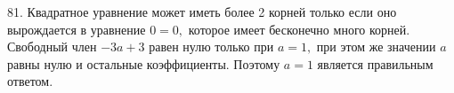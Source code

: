 81. Квадратное уравнение может иметь более 2 корней только если оно вырождается в уравнение $0=0,$ которое имеет бесконечно много корней. Свободный член $-3a+3$ равен нулю только при $a=1,$ при этом же значении $a$ равны нулю и остальные коэффициенты. Поэтому $a=1$ является правильным ответом.\\
